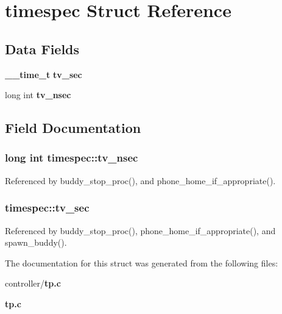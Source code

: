 \section{timespec Struct Reference}
\label{structtimespec}
\subsection*{Data Fields}
\begin{DoxyCompactItemize}
\item 
{\bf \_\-\_\-time\_\-t} {\bf tv\_\-sec}
\item 
long int {\bf tv\_\-nsec}
\end{DoxyCompactItemize}


\subsection{Field Documentation}
\subsubsection[{tv\_\-nsec}]{\setlength{\rightskip}{0pt plus 5cm}long int {\bf timespec::tv\_\-nsec}}\label{structtimespec_aa9689622a344d847333e534ac23d3093}


Referenced by buddy\_\-stop\_\-proc(), and phone\_\-home\_\-if\_\-appropriate().

\subsubsection[{tv\_\-sec}]{ {\bf timespec::tv\_\-sec}}\label{structtimespec_a589c1cbd315a9dd339f4fff9dfae15be}


Referenced by buddy\_\-stop\_\-proc(), phone\_\-home\_\-if\_\-appropriate(), and spawn\_\-buddy().



The documentation for this struct was generated from the following files:\begin{DoxyCompactItemize}
\item 
controller/{\bf tp.c}\item 
{\bf tp.c}\end{DoxyCompactItemize}
